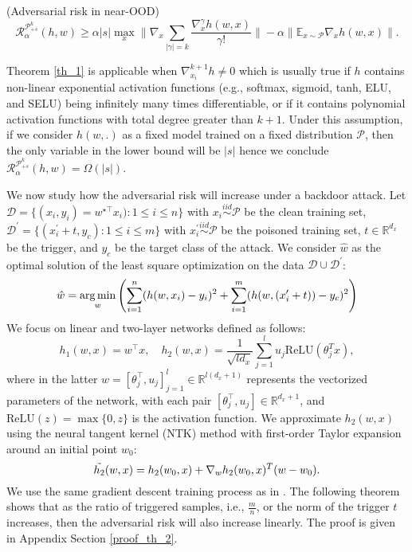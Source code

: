 {\begin{theorem}
\label{th_1}
(Adversarial risk in near-OOD) 
\[
\mathcal{R}^{\mathcal{P}^{k}_{+s}}_{\alpha}(h,w) \geq
\alpha |s| \max_{x} \| \nabla_x \sum_{|\gamma|=k} \frac{\nabla_x^{\gamma} h(w,x)}{\gamma!} \| -  \alpha \| \mathbb{E}_{x \sim \mathcal{P}} \nabla_x h(w,x) \|.
\]

\end{theorem}


\begin{remark}

Theorem \ref{th_1} is applicable when $\nabla_{x_i}^{k+1} h \neq 0$ which is usually true if $h$ contains non-linear exponential activation functions (e.g., softmax, sigmoid, tanh, ELU, and SELU) being infinitely many times differentiable, or if it contains polynomial activation functions with total degree greater than $k+1$. Under this assumption, if we consider $h(w,.)$ as a fixed model trained on a fixed distribution $\mathcal{P}$, then the only variable in the lower bound will be $|s|$ hence we conclude $\mathcal{R}^{\mathcal{P}^{k}_{+s}}_{\alpha}(h,w) = \Omega(|s|)$.

\end{remark}

We now study how the adversarial risk will increase under a backdoor attack. Let $\mathcal{D} = \{(x_i, y_i) = w^{\star \top} x_i) : 1 \leq i \leq n \} $ with $x_i \overset{iid}{\sim} \mathcal{P}$  be the clean training set, $\mathcal{D}^\prime = \{(x^\prime_i + t, y_c) : 1 \leq i \leq m \}$ with $x^\prime_i \overset{iid}{\sim} \mathcal{P}$ be the poisoned training set, $t \in \mathbb{R}^{d_x}$ be the trigger, and $y_c$ be the target class of the attack. We consider $\hat{w}$ as the optimal solution of the least square optimization on the data $\mathcal{D} \cup \mathcal{D}^\prime$:
\begin{equation}
\label{eq_w}
    \hat{w} = \operatorname*{arg\,min}_w \left( \sum_{i=1}^n(h(w,x_i) - y_i)^2 + \sum_{i=1}^m(h(w,(x'_i + t)) - y_c)^2 \right)
\end{equation}
We focus on linear and two-layer networks defined as follows:
$$
h_1(w,x) = w^\top x
, \quad
h_2(w,x) = \frac{1}{\sqrt{ld_x}} \sum_{j=1}^l u_j \text{ReLU}(\theta_j^T x),
$$
where in the latter $w = [\theta_j^\top, u_j]_{j=1}^l \in \mathbb{R}^{l(d_x+1)}$ represents the vectorized parameters of the network, with each pair $[\theta_j^\top, u_j] \in \mathbb{R}^{d_x+1}$, and $\text{ReLU}(z) = \max\{0, z\}$ is the activation function. We approximate $h_2(w,x)$ using the neural tangent kernel (NTK) \cite{jacot2018neural} method with first-order Taylor expansion around an initial point $w_0$:
\[
\Tilde{h_2}(w,x) = h_2(w_0,x) + \nabla_w h_2(w_0,x)^T (w - w_0).
\]
We use the same gradient descent training process as in \cite{hao2024surprising}. The following theorem shows that as the ratio of triggered samples, i.e., $\frac{m}{n}$, or the norm of the trigger $t$ increases, then the adversarial risk will also increase linearly. The proof is given in Appendix Section \ref{proof_th_2}.

}
